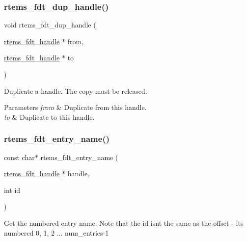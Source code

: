 \subsubsection{\texorpdfstring{rtems\_fdt\_dup\_handle()}{rtems\_fdt\_dup\_handle()}}
{\footnotesize\ttfamily void rtems\+\_\+fdt\+\_\+dup\+\_\+handle (\begin{DoxyParamCaption}\item[{\mbox{\hyperlink{structrtems__fdt__handle}{rtems\+\_\+fdt\+\_\+handle}} $\ast$}]{from,  }\item[{\mbox{\hyperlink{structrtems__fdt__handle}{rtems\+\_\+fdt\+\_\+handle}} $\ast$}]{to }\end{DoxyParamCaption})}

Duplicate a handle. The copy must be released.


\begin{DoxyParams}{Parameters}
{\em from} & Duplicate from this handle. \\
\hline
{\em to} & Duplicate to this handle. \\
\hline
\end{DoxyParams}
\mbox{\label{rtems-fdt_8h_a40fcb9df3611e0a99021b38f00571713}} 
\subsubsection{\texorpdfstring{rtems\_fdt\_entry\_name()}{rtems\_fdt\_entry\_name()}}
{\footnotesize\ttfamily const char$\ast$ rtems\+\_\+fdt\+\_\+entry\+\_\+name (\begin{DoxyParamCaption}\item[{\mbox{\hyperlink{structrtems__fdt__handle}{rtems\+\_\+fdt\+\_\+handle}} $\ast$}]{handle,  }\item[{int}]{id }\end{DoxyParamCaption})}

Get the numbered entry name. Note that the id isn\textquotesingle{}t the same as the offset -\/ it\textquotesingle{}s numbered 0, 1, 2 ... num\+\_\+entries-\/1 \mbox{\label{rtems-fdt_8h_a5a00ac7324cf4c362286922a734a7e79}} 
